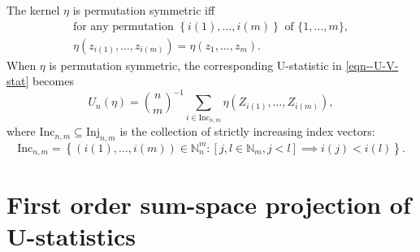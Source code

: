 \documentclass[12pt]{article}
\numberwithin{equation}{section}
\theoremstyle{definition}
\theoremstyle{plain}
\begin{document}
The kernel \(\eta\) is permutation symmetric iff
\begin{equation*}
  \begin{gathered}
    \text{for any permutation } \left\{ i (1), \dots, i (m) \right\} \text{ of }
    \{1, \dots, m\}, \\
    \eta \left( z_{i (1)}, \dots, z_{i (m)} \right) = \eta \left( z_{1},
    \dots, z_{m} \right).
  \end{gathered}
\end{equation*}
When \(\eta\) is permutation symmetric, the corresponding U-statistic in
\eqref{eqn--U-V-stat} becomes
\begin{equation*}
  U_{n} (\eta) = \binom{n}{m}^{- 1} \sum_{i \in \mathrm{Inc}_{n, m}} \eta
  \left( Z_{i (1)}, \dots, Z_{i (m)} \right),
\end{equation*}
where \(\mathrm{Inc}_{n, m} \subseteq \mathrm{Inj}_{n, m}\) is the collection of
strictly increasing index vectors:
\begin{equation}
  \mathrm{Inc}_{n, m} = \left\{ (i (1), \dots, i (m)) \in \mathbb{N}_{n}^{m} :
  \left[ j, l \in \mathbb{N}_{m}, j < l \right] \implies i (j) < i (l) \right\}.
  \label{eqn--monotone-indices}
\end{equation}

\section{First order sum-space projection of U-statistics}
\end{document}
